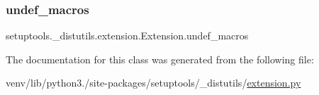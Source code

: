 \mbox{\label{classsetuptools_1_1__distutils_1_1extension_1_1Extension_a8b95c2b363310e2394cb00325d9eb316}} 
\subsubsection{\texorpdfstring{undef\+\_\+macros}{undef\_macros}}
{\footnotesize\ttfamily setuptools.\+\_\+distutils.\+extension.\+Extension.\+undef\+\_\+macros}



The documentation for this class was generated from the following file\+:\begin{DoxyCompactItemize}
\item 
venv/lib/python3./site-\/packages/setuptools/\+\_\+distutils/\hyperlink{setuptools_2__distutils_2extension_8py}{extension.\+py}\end{DoxyCompactItemize}
